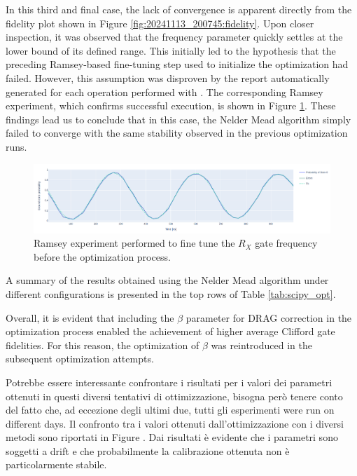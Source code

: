 In this third and final case, the lack of convergence is apparent directly from the fidelity plot shown in Figure \ref{fig:20241113_200745:fidelity}.
Upon closer inspection, it was observed that the frequency parameter quickly settles at the lower bound of its defined range. 
This initially led to the hypothesis that the preceding Ramsey-based fine-tuning step used to initialize the optimization had failed.
However, this assumption was disproven by the report automatically generated for each operation performed with \Qibocal.
The corresponding Ramsey experiment, which confirms successful execution, is shown in Figure \ref{fig:Ramsey_NM}.
These findings lead us to conclude that in this case, the Nelder Mead algorithm simply failed to converge with the same stability observed in the previous optimization runs.

\begin{figure}[h!]
    \centering
    \includegraphics[width=\textwidth]{figures/png/RB_optimization/NM/InitialSymplex/20241113_200745/Ramsey.png}
    \caption{Ramsey experiment performed to fine tune the $R_X$ gate frequency before the optimization process.}
    \label{fig:Ramsey_NM}
\end{figure}

A summary of the results obtained using the Nelder Mead algorithm under different configurations is presented in the top rows of Table \ref{tab:scipy_opt}.

Overall, it is evident that including the $\beta$ parameter for DRAG correction in the optimization process enabled the achievement of higher average Clifford gate fidelities. For this reason, the optimization of $\beta$ was reintroduced in the subsequent optimization attempts.    

Potrebbe essere interessante confrontare i risultati per i valori dei parametri ottenuti in questi diversi tentativi di ottimizzazione, bisogna però tenere conto del fatto che, ad eccezione degli ultimi due, tutti gli esperimenti were run on different days.
Il confronto tra i valori ottenuti dall'ottimizzazione con i diversi metodi sono riportati in Figure . Dai risultati è evidente che i parametri sono soggetti a drift e che probabilmente la calibrazione ottenuta non è particolarmente stabile.

